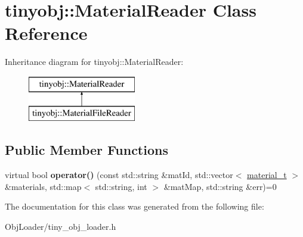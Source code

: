 \hypertarget{classtinyobj_1_1_material_reader}{}\section{tinyobj\+:\+:Material\+Reader Class Reference}
\label{classtinyobj_1_1_material_reader}
Inheritance diagram for tinyobj\+:\+:Material\+Reader\+:\begin{figure}[H]
\begin{center}
\leavevmode
\includegraphics[height=2.000000cm]{classtinyobj_1_1_material_reader}
\end{center}
\end{figure}
\subsection*{Public Member Functions}
\begin{DoxyCompactItemize}
\item 
\mbox{\label{classtinyobj_1_1_material_reader_afa193c78cea3a3618808165ba19697e0}} 
virtual bool {\bfseries operator()} (const std\+::string \&mat\+Id, std\+::vector$<$ \hyperlink{structtinyobj_1_1material__t}{material\+\_\+t} $>$ \&materials, std\+::map$<$ std\+::string, int $>$ \&mat\+Map, std\+::string \&err)=0
\end{DoxyCompactItemize}


The documentation for this class was generated from the following file\+:\begin{DoxyCompactItemize}
\item 
Obj\+Loader/tiny\+\_\+obj\+\_\+loader.\+h\end{DoxyCompactItemize}
